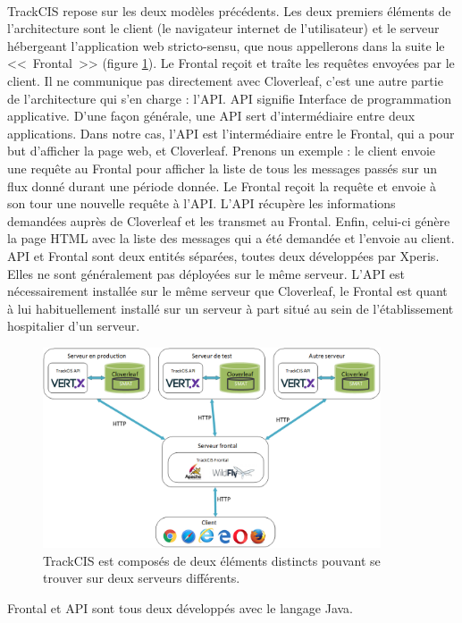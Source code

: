 			\paragraph{}%
			TrackCIS repose sur les deux modèles précédents. Les deux
			premiers éléments de l'architecture sont le client (le navigateur internet
			de l'utilisateur) et le serveur hébergeant l'application web stricto-sensu,
			que nous appellerons dans la suite le <<~Frontal~>> (figure
			\ref{archi_trackcis}).
			Le Frontal reçoit et traîte les requêtes envoyées par le client. Il
			ne communique pas directement avec Cloverleaf, c'est une autre partie de
			l'architecture qui s'en charge : l'API.
			API signifie Interface de programmation applicative. D'une façon générale,
			une API sert d'intermédiaire entre deux applications. Dans notre cas, l'API est
			l'intermédiaire entre le Frontal, qui a pour but d'afficher la page web, et
			Cloverleaf. Prenons un exemple : le client envoie une requête au Frontal
			pour afficher la liste de tous les messages passés sur un flux donné durant
			une période donnée. Le Frontal reçoit la requête et envoie à son tour une
			nouvelle requête à l'API.
			L'API récupère les informations demandées auprès de Cloverleaf et
			les transmet au Frontal. Enfin, celui-ci génère la page HTML avec la liste
			des messages qui a été demandée et l'envoie au client.\newline
			API et Frontal sont deux entités séparées, toutes deux développées par
			Xperis. Elles ne sont généralement pas déployées sur le même serveur. L'API
			est nécessairement installée sur le même serveur que Cloverleaf, le Frontal est
			quant à lui habituellement installé sur un serveur à part situé au
			sein de l'établissement hospitalier d'un serveur.
			\begin{figure}[H]%
				\centering
				\includegraphics[width=10cm]{../img/part3/archi_trackcis.png}
				\caption{\label{archi_trackcis} TrackCIS est composés de deux éléments
				distincts pouvant se trouver sur deux serveurs différents.}
			\end{figure}
			Frontal et API sont tous deux développés avec le langage Java.
			
